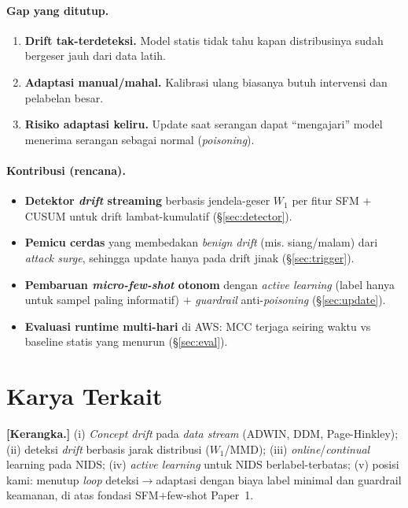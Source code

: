 \documentclass[11pt,a4paper]{article}
\begin{document}
\paragraph{Gap yang ditutup.}
\begin{enumerate}
  \item \textbf{Drift tak-terdeteksi.} Model statis tidak tahu kapan
  distribusinya sudah bergeser jauh dari data latih.
  \item \textbf{Adaptasi manual/mahal.} Kalibrasi ulang biasanya butuh intervensi
  dan pelabelan besar.
  \item \textbf{Risiko adaptasi keliru.} Update saat serangan dapat
  ``mengajari'' model menerima serangan sebagai normal (\emph{poisoning}).
\end{enumerate}

\paragraph{Kontribusi (rencana).}
\begin{itemize}
  \item \textbf{Detektor \emph{drift} streaming} berbasis jendela-geser $W_1$ per
  fitur SFM $+$ CUSUM untuk drift lambat-kumulatif (\S\ref{sec:detector}).
  \item \textbf{Pemicu cerdas} yang membedakan \emph{benign drift} (mis.
  siang/malam) dari \emph{attack surge}, sehingga update hanya pada drift jinak
  (\S\ref{sec:trigger}).
  \item \textbf{Pembaruan \emph{micro-few-shot} otonom} dengan \emph{active
  learning} (label hanya untuk sampel paling informatif) $+$ \emph{guardrail}
  anti-\emph{poisoning} (\S\ref{sec:update}).
  \item \textbf{Evaluasi runtime multi-hari} di AWS: MCC terjaga seiring waktu
  vs baseline statis yang menurun (\S\ref{sec:eval}).
\end{itemize}

\section{Karya Terkait}
\label{sec:related}
\textbf{[Kerangka.]} (i) \emph{Concept drift} pada \emph{data stream} (ADWIN,
DDM, Page-Hinkley); (ii) deteksi \emph{drift} berbasis jarak distribusi
($W_1$/MMD); (iii) \emph{online}/\emph{continual} learning pada NIDS;
(iv) \emph{active learning} untuk NIDS berlabel-terbatas; (v) posisi kami:
menutup \emph{loop} deteksi$\rightarrow$adaptasi dengan biaya label minimal dan
guardrail keamanan, di atas fondasi SFM$+$few-shot Paper~1.
\end{document}
